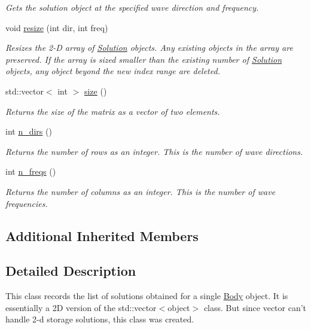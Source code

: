 \begin{DoxyCompactItemize}
\begin{DoxyCompactList}\small\item\em Gets the solution object at the specified wave direction and frequency. \end{DoxyCompactList}\item 
void \hyperlink{classosea_1_1ofreq_1_1_solution_set_a1f01e0b7d5b72c8b225f15dc8d921315}{resize} (int dir, int freq)
\begin{DoxyCompactList}\small\item\em Resizes the 2-\/\-D array of \hyperlink{classosea_1_1ofreq_1_1_solution}{Solution} objects. Any existing objects in the array are preserved. If the array is sized smaller than the existing number of \hyperlink{classosea_1_1ofreq_1_1_solution}{Solution} objects, any object beyond the new index range are deleted. \end{DoxyCompactList}\item 
std\-::vector$<$ int $>$ \hyperlink{classosea_1_1ofreq_1_1_solution_set_a2484020f280cce582ae20f7631963adb}{size} ()
\begin{DoxyCompactList}\small\item\em Returns the size of the matrix as a vector of two elements. \end{DoxyCompactList}\item 
int \hyperlink{classosea_1_1ofreq_1_1_solution_set_a8cfe38b972cb389453a5251767c0defa}{n\-\_\-dirs} ()
\begin{DoxyCompactList}\small\item\em Returns the number of rows as an integer. This is the number of wave directions. \end{DoxyCompactList}\item 
int \hyperlink{classosea_1_1ofreq_1_1_solution_set_a03842750155f8eb60f1cc6ec46b8e85e}{n\-\_\-freqs} ()
\begin{DoxyCompactList}\small\item\em Returns the number of columns as an integer. This is the number of wave frequencies. \end{DoxyCompactList}\end{DoxyCompactItemize}
\subsection*{Additional Inherited Members}


\subsection{Detailed Description}
This class records the list of solutions obtained for a single \hyperlink{classosea_1_1ofreq_1_1_body}{Body} object. It is essentially a 2\-D version of the std\-::vector$<$object$>$ class. But since vector can't handle 2-\/d storage solutions, this class was created. 

